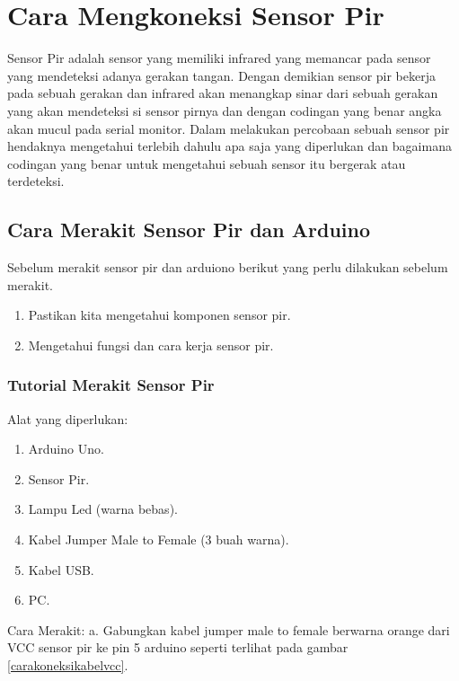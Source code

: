 
\section{Cara Mengkoneksi Sensor Pir}

Sensor Pir adalah sensor yang memiliki infrared yang memancar pada sensor yang mendeteksi adanya gerakan tangan.
Dengan demikian sensor pir bekerja pada sebuah gerakan dan infrared akan menangkap sinar dari sebuah gerakan yang akan mendeteksi si sensor pirnya dan dengan codingan yang benar angka akan mucul pada serial monitor.
Dalam melakukan percobaan sebuah sensor pir hendaknya mengetahui terlebih dahulu apa saja yang diperlukan dan bagaimana codingan yang benar untuk mengetahui sebuah sensor itu bergerak atau terdeteksi.

\subsection {Cara Merakit Sensor Pir dan Arduino}

Sebelum merakit sensor pir dan arduiono berikut yang perlu dilakukan sebelum merakit.
\begin{enumerate}
\item Pastikan kita mengetahui komponen sensor pir.
\item Mengetahui fungsi dan cara kerja sensor pir.
\end{enumerate}

\subsubsection {Tutorial Merakit Sensor Pir}
Alat yang diperlukan:
\begin{enumerate}
\item Arduino Uno.
\item Sensor Pir.
\item Lampu Led (warna bebas).
\item Kabel Jumper Male to Female (3 buah warna).
\item Kabel USB.
\item PC.
\end{enumerate}

Cara Merakit:
a. Gabungkan kabel jumper male to female berwarna orange dari VCC sensor pir ke pin 5 arduino seperti terlihat pada gambar \ref{carakoneksikabelvcc}.



